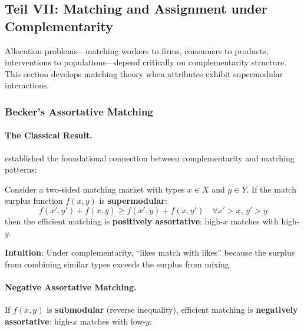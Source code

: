 \subsection{Teil VII: Matching and Assignment under Complementarity}
\label{sec:matching}

Allocation problems---matching workers to firms, consumers to products, interventions 
to populations---depend critically on complementarity structure. This section develops 
matching theory when attributes exhibit supermodular interactions.

\subsubsection{Becker's Assortative Matching}

\paragraph{The Classical Result.}

\citet{PAP-becker1973theory} established the foundational connection between complementarity 
and matching patterns:

\begin{theorem}
\label{thm:becker}
Consider a two-sided matching market with types $x \in X$ and $y \in Y$. If the 
match surplus function $f(x, y)$ is \textbf{supermodular}:
\begin{equation}
f(x', y') + f(x, y) \geq f(x', y) + f(x, y') \quad \forall x' > x, \, y' > y
\end{equation}
then the efficient matching is \textbf{positively assortative}: high-$x$ matches 
with high-$y$.
\end{theorem}

\textbf{Intuition}: Under complementarity, ``likes match with likes'' because the 
surplus from combining similar types exceeds the surplus from mixing.

\paragraph{Negative Assortative Matching.}

\begin{corollary}
\label{cor:negative-assort}
If $f(x, y)$ is \textbf{submodular} (reverse inequality), efficient matching is 
\textbf{negatively assortative}: high-$x$ matches with low-$y$.
\end{corollary}

